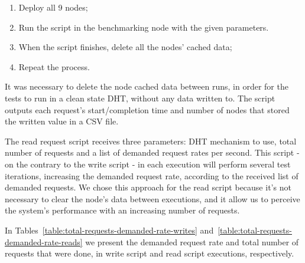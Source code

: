 \begin{enumerate}
  \item Deploy all 9 nodes;
  \item Run the script in the benchmarking node with the given parameters.
  \item When the script finishes, delete all the nodes' cached data;
  \item Repeat the process.
\end{enumerate}

It was necessary to delete the node cached data between runs, in order for the tests to run in a clean state DHT, without any data written to.
The script outputs each request's start/completion time and number of nodes that stored the written value in a CSV file.

The read request script receives three parameters: DHT mechanism to use, total number of requests and a list of demanded request rates per second.
This script - on the contrary to the write script - in each execution will perform several test iterations, increasing the demanded request rate, according to the received list of demanded requests.
We chose this approach for the read script because it's not necessary to clear the node's data between executions, and it allow us to perceive the system's performance with an increasing number of requests.

In Tables~\ref{table:total-requests-demanded-rate-writes} and~\ref{table:total-requests-demanded-rate-reads} we present the demanded request rate and total number of requests that were done, in write script and read script executions, respectively.

\begin{table}[htb]
\centering
{}
\caption{Number of write requests performed according to demanded request rate.}
\label{table:total-requests-demanded-rate-writes}
\end{table}

